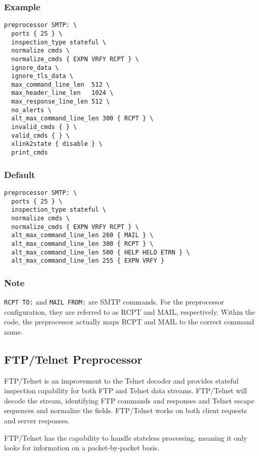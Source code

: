 \documentclass[english]{report}
\begin{document}
\subsubsection{Example}

\begin{verbatim}
preprocessor SMTP: \
  ports { 25 } \
  inspection_type stateful \
  normalize cmds \
  normalize_cmds { EXPN VRFY RCPT } \
  ignore_data \
  ignore_tls_data \
  max_command_line_len  512 \
  max_header_line_len   1024 \
  max_response_line_len 512 \
  no_alerts \
  alt_max_command_line_len 300 { RCPT } \
  invalid_cmds { } \
  valid_cmds { } \
  xlink2state { disable } \
  print_cmds
\end{verbatim}

\subsubsection{Default}

\begin{verbatim}
preprocessor SMTP: \
  ports { 25 } \
  inspection_type stateful \
  normalize cmds \
  normalize_cmds { EXPN VRFY RCPT } \
  alt_max_command_line_len 260 { MAIL } \
  alt_max_command_line_len 300 { RCPT } \
  alt_max_command_line_len 500 { HELP HELO ETRN } \
  alt_max_command_line_len 255 { EXPN VRFY }
\end{verbatim}

\subsubsection{Note}
\texttt{RCPT TO:} and \texttt{MAIL FROM:} are SMTP commands.  For the preprocessor
configuration, they are referred to as RCPT and MAIL, respectively.
Within the code, the preprocessor actually maps RCPT and MAIL to the
correct command name.

\subsection{FTP/Telnet Preprocessor\label{sub:ftptelnet}}

FTP/Telnet is an improvement to the Telnet decoder and provides
stateful inspection capability for both FTP and Telnet data
streams.  FTP/Telnet will decode the stream, identifying FTP
commands and responses and Telnet escape sequences and
normalize the fields.  FTP/Telnet works on both client requests
and server responses.

FTP/Telnet has the capability to handle stateless processing, meaning
it only looks for information on a packet-by-packet basis.  
\end{document}
